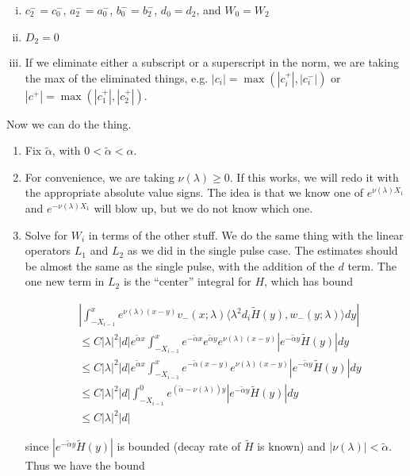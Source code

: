 \documentclass[12pt]{article}
\begin{document}
\begin{enumerate}[(i)]
\item $c_2^- = c_0^-$, $a_2^- = a_0^-$, $b_0^- = b_2^-$, $d_0 = d_2$, and $W_0 = W_2$
\item $D_2 = 0$
\item If we eliminate either a subscript or a superscript in the norm, we are taking the max of the eliminated things, e.g. $|c_i| = \max(|c_i^+|, |c_i^-|)$ or $|c^+| = \max(|c_1^+|, |c_2^+|)$. 
\end{enumerate}

Now we can do the thing.

\begin{enumerate}

\item Fix $\tilde{\alpha}$, with $0 < \tilde{\alpha} < \alpha$. 

\item For convenience, we are taking $\nu(\lambda) \geq 0$. If this works, we will redo it with the appropriate absolute value signs. The idea is that we know one of $e^{\nu(\lambda) X_1}$ and $e^{-\nu(\lambda) X_1}$ will blow up, but we do not know which one.

\item Solve for $W_i$ in terms of the other stuff. We do the same thing with the linear operators $L_1$ and $L_2$ as we did in the single pulse case. The estimates should be almost the same as the single pulse, with the addition of the $d$ term. The one new term in $L_2$ is the ``center'' integral for $H$, which has bound

\begin{align*}
&\left| \int_{-X_{i-1}}^x 
e^{\nu(\lambda)(x-y)} v_-(x; \lambda) \langle \lambda^2 d_i \tilde{H}(y), w_-(y; \lambda) \rangle dy \right| \\
&\leq C |\lambda|^2 |d| e^{\tilde{\alpha}x} \int_{-X_{i-1}}^x e^{-\tilde{\alpha}x} e^{\tilde{\alpha}y} e^{\nu(\lambda)(x-y)} |e^{-\tilde{\alpha}y}\tilde{H}(y)|dy \\
&\leq C |\lambda|^2 |d| e^{\tilde{\alpha}x} \int_{-X_{i-1}}^x e^{-\tilde{\alpha}(x-y)} e^{\nu(\lambda)(x-y)} |e^{-\tilde{\alpha}y}\tilde{H}(y)|dy \\
&\leq C |\lambda|^2 |d| \int_{-X_{i-1}}^0 e^{(\tilde{\alpha}-\nu(\lambda))y} |e^{-\tilde{\alpha}y}\tilde{H}(y)|dy \\
&\leq C |\lambda|^2 |d|
\end{align*}

since $|e^{-\tilde{\alpha}y}\tilde{H}(y)|$ is bounded (decay rate of $\tilde{H}$ is known) and $|\nu(\lambda)| < \tilde{\alpha}$. Thus we have the bound


\end{enumerate}
\end{document}

